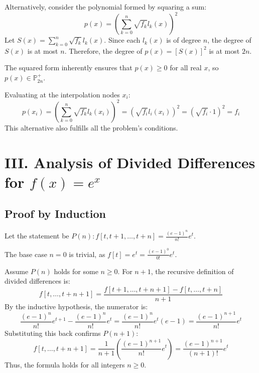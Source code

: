 \documentclass[a4paper]{article}
\begin{document}
Alternatively, consider the polynomial formed by squaring a sum:
\[
p(x) = \left( \sum_{k=0}^{n} \sqrt{f_k} l_k(x) \right)^2
\]
Let $S(x) = \sum_{k=0}^{n} \sqrt{f_k} l_k(x)$. Since each $l_k(x)$ is of degree $n$, the degree of $S(x)$ is at most $n$. Therefore, the degree of $p(x) = [S(x)]^2$ is at most $2n$.

The squared form inherently ensures that $p(x) \ge 0$ for all real $x$, so $p(x) \in \mathbb{P}_{2n}^+$.

Evaluating at the interpolation nodes $x_i$:
\[
p(x_i) = \left( \sum_{k=0}^{n} \sqrt{f_k} l_k(x_i) \right)^2 = \left( \sqrt{f_i} l_i(x_i) \right)^2 = \left( \sqrt{f_i} \cdot 1 \right)^2 = f_i
\]
This alternative also fulfills all the problem's conditions.




\section*{III. Analysis of Divided Differences for $f(x)=e^x$}

\subsection*{Proof by Induction}

Let the statement be $P(n): f[t, t+1, \dots, t+n] = \frac{(e-1)^n}{n!}e^t$.

The base case $n=0$ is trivial, as $f[t] = e^t = \frac{(e-1)^0}{0!}e^t$.

Assume $P(n)$ holds for some $n \ge 0$. For $n+1$, the recursive definition of divided differences is:
\[
f[t, \dots, t+n+1] = \frac{f[t+1, \dots, t+n+1] - f[t, \dots, t+n]}{n+1}
\]
By the inductive hypothesis, the numerator is:
\[
\frac{(e-1)^n}{n!}e^{t+1} - \frac{(e-1)^n}{n!}e^t = \frac{(e-1)^n}{n!}e^t(e-1) = \frac{(e-1)^{n+1}}{n!}e^t
\]
Substituting this back confirms $P(n+1)$:
\[
f[t, \dots, t+n+1] = \frac{1}{n+1} \left( \frac{(e-1)^{n+1}}{n!}e^t \right) = \frac{(e-1)^{n+1}}{(n+1)!}e^t
\]
Thus, the formula holds for all integers $n \ge 0$.
\end{document}
